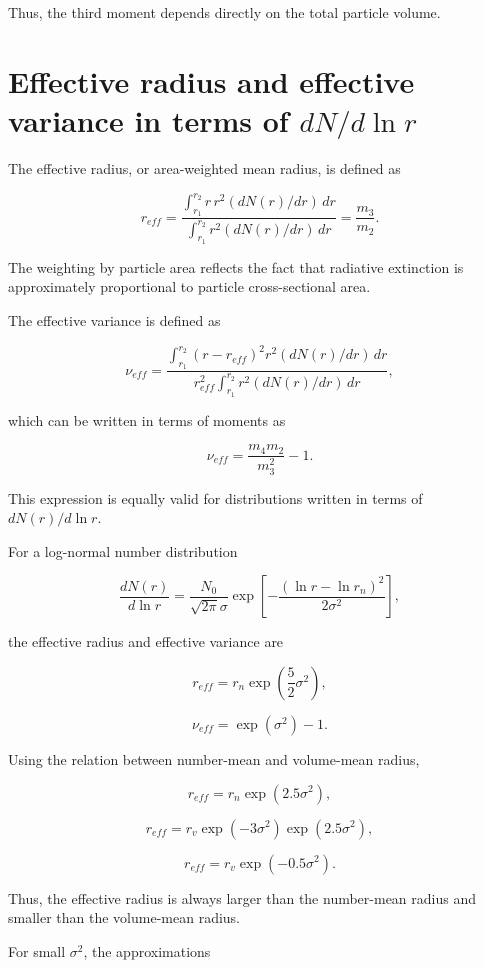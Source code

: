 \documentclass[
  letterpaper,
]{scrbook}
\begin{document}
Thus, the third moment depends directly on the total particle volume.

\section{\texorpdfstring{Effective radius and effective variance in
terms of
\(dN/d\ln r\)}{Effective radius and effective variance in terms of dN/d\textbackslash ln r}}\label{effective-radius-and-effective-variance-in-terms-of-dndln-r}

The effective radius, or area-weighted mean radius, is defined as

\[
r_{eff}=\frac{\int_{r_1}^{r_2} r \, r^2 (dN(r)/dr) \, dr}{\int_{r_1}^{r_2} r^2 (dN(r)/dr) \, dr}
=\frac{m_3}{m_2}.
\]

The weighting by particle area reflects the fact that radiative
extinction is approximately proportional to particle cross-sectional
area.

The effective variance is defined as

\[
\nu_{eff}=\frac{\int_{r_1}^{r_2}(r-r_{eff})^2 r^2 (dN(r)/dr) \, dr}
{r^2_{eff} \int_{r_1}^{r_2}r^2 (dN(r)/dr) \, dr},
\]

which can be written in terms of moments as

\[
\nu_{eff}= \frac{m_4 m_2}{m_3^2}-1.
\]

This expression is equally valid for distributions written in terms of
\(dN(r)/d\ln r\).

For a log-normal number distribution

\[
\frac{d N(r)}{d \ln r}=\frac{N_0}{\sqrt{2 \pi} \sigma} \exp\left[-\frac{(\ln r-\ln r_n)^2}{2 \sigma^2}\right],
\]

the effective radius and effective variance are

\[
r_{eff}=r_n \exp\left(\frac{5}{2} \sigma^2\right),
\]

\[
\nu_{eff}=\exp (\sigma^2)-1.
\]

Using the relation between number-mean and volume-mean radius,

\[
r_{eff}=r_n \exp(2.5 \sigma^2),
\]

\[
r_{eff}=r_v \exp(-3 \sigma^2) \exp(2.5 \sigma^2),
\]

\[
r_{eff}=r_v \exp(-0.5 \sigma^2).
\]

Thus, the effective radius is always larger than the number-mean radius
and smaller than the volume-mean radius.

For small \(\sigma^2\), the approximations
\end{document}
